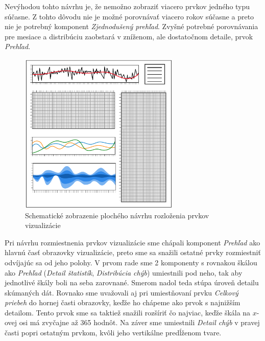Nevýhodou tohto návrhu je, že nemožno zobraziť viacero prvkov jedného typu súčasne. Z tohto dôvodu nie je možné porovnávať viacero rokov súčasne a preto nie je potrebný komponent \textit{Zjednodušený prehľad}. Zvyšné potrebné porovnávania pre mesiace a distribúciu zaobstará v zníženom, ale dostatočnom detaile, prvok \textit{Prehľad}. 


\begin{figure}
	\centering
	\includegraphics[width = 3.0in]{flatlayout}
	\caption{Schematické zobrazenie plochého návrhu rozloženia prvkov vizualizácie}
	\label{fig:flatlayout}
\end{figure}

Pri návrhu rozmiestnenia prvkov vizualizácie sme chápali komponent \textit{Prehľad} ako hlavnú časť obrazovky vizualizácie, preto sme sa snažili ostatné prvky rozmiestniť odvíjajúc sa od jeho polohy. V prvom rade sme 2 komponenty s rovnakou škálou ako \textit{Prehľad} (\textit{Detail štatistík}, \textit{Distribúcia chýb}) umiestnili pod neho, tak aby jednotlivé škály boli na seba zarovnané. Smerom nadol teda stúpa úroveň detailu skúmaných dát. Rovnako sme uvažovali aj pri umiestňovaní prvku \textit{Celkový priebeh} do hornej časti obrazovky, keďže ho chápeme ako prvok s najnižším detailom. Tento prvok sme sa taktiež snažili rozšíriť čo najviac, keďže škála na \mbox{$ x $-ovej} osi má zvyčajne až 365 hodnôt. Na záver sme umiestnili \textit{Detail chýb} v pravej časti popri ostatným prvkom, kvôli jeho vertikálne predĺženom tvare.
